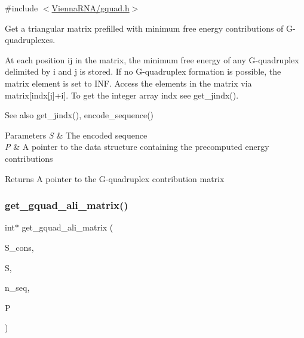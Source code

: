 {\ttfamily \#include $<$\mbox{\hyperlink{gquad_8h}{Vienna\+R\+N\+A/gquad.\+h}}$>$}



Get a triangular matrix prefilled with minimum free energy contributions of G-\/quadruplexes. 

At each position ij in the matrix, the minimum free energy of any G-\/quadruplex delimited by i and j is stored. If no G-\/quadruplex formation is possible, the matrix element is set to I\+NF. Access the elements in the matrix via matrix\mbox{[}indx\mbox{[}j\mbox{]}+i\mbox{]}. To get the integer array indx see get\+\_\+jindx().

\begin{DoxySeeAlso}{See also}
get\+\_\+jindx(), encode\+\_\+sequence()
\end{DoxySeeAlso}

\begin{DoxyParams}{Parameters}
{\em S} & The encoded sequence \\
\hline
{\em P} & A pointer to the data structure containing the precomputed energy contributions \\
\hline
\end{DoxyParams}
\begin{DoxyReturn}{Returns}
A pointer to the G-\/quadruplex contribution matrix 
\end{DoxyReturn}
\mbox{\label{group__gquads_gab30685e61b49bbb2c6b5a4b8e87749fe}} 
\subsubsection{\texorpdfstring{get\+\_\+gquad\+\_\+ali\+\_\+matrix()}{get\_gquad\_ali\_matrix()}}
{\footnotesize\ttfamily int$\ast$ get\+\_\+gquad\+\_\+ali\+\_\+matrix (\begin{DoxyParamCaption}\item[{short $\ast$}]{S\+\_\+cons,  }\item[{short $\ast$$\ast$}]{S,  }\item[{int}]{n\+\_\+seq,  }\item[{\mbox{\hyperlink{group__energy__parameters_ga8a69ca7d787e4fd6079914f5343a1f35}{vrna\+\_\+param\+\_\+t}} $\ast$}]{P }\end{DoxyParamCaption})}



